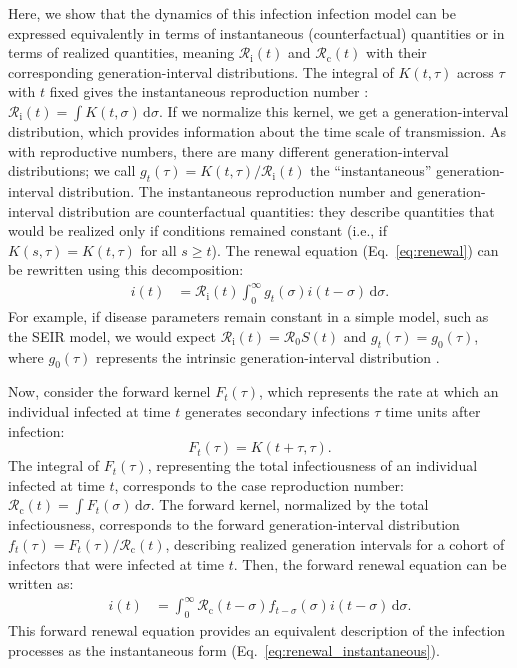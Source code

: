 \documentclass[12pt]{article}
\newcommand{\eref}[1]{Eq.~\ref{eq:#1}}
\newcommand{\Rx}[1]{\ensuremath{{\mathcal R}_{#1}}\xspace}
\newcommand{\Ro}{\Rx{0}}
\newcommand{\Rc}{\Rx{\mathrm{c}}}
\newcommand{\Ri}{\Rx{\mathrm{i}}}
\newcommand{\dd}[1]{\ensuremath{\, \mathrm{d}#1}}
\newcommand{\dsigma}{\dd{\sigma}}
\begin{document}
Here, we show that the dynamics of this infection infection model can be expressed equivalently in terms of instantaneous (counterfactual) quantities or in terms of realized quantities, meaning $\Ri(t)$ and $\Rc(t)$ with their corresponding generation-interval distributions.
The integral of $K(t, \tau)$ across $\tau$ with $t$ fixed gives the instantaneous reproduction number \citep{fraser2007estimating}: $\Ri(t) = \int K(t, \sigma) \dsigma$.
If we normalize this kernel, we get a generation-interval distribution, which provides information about the time scale of transmission.
As with reproductive numbers, there are many different generation-interval distributions; we call $g_t(\tau) = K(t, \tau)/\Ri(t)$ the ``instantaneous'' generation-interval distribution.
The instantaneous reproduction number and generation-interval distribution are counterfactual quantities: they describe quantities that would be realized only if conditions remained constant (i.e., if $K(s, \tau) = K(t, \tau)$ for all $s \geq t$).
The renewal equation (\eref{renewal}) can be rewritten using this decomposition:
\begin{align}
i(t) &= \Ri(t) \int_0^\infty g_t(\sigma) i(t-\sigma) \dsigma.
\label{eq:renewal_instantaneous}
\end{align}
For example, if disease parameters remain constant in a simple model, such as the SEIR model, we would expect $\Ri(t) = \Ro S(t)$ and $g_t(\tau) = g_0(\tau)$, where $g_0(\tau)$ represents the intrinsic generation-interval distribution \citep{champredon2015intrinsic}.

Now, consider the forward kernel $F_t(\tau)$, which represents the rate at which an individual infected at time $t$ generates secondary infections $\tau$ time units after infection: 
\begin{equation}
F_t(\tau) = K(t+\tau, \tau).
\label{eq:fkernel}
\end{equation}
The integral of $F_t(\tau)$, representing the total infectiousness of an individual infected at time $t$, corresponds to the case reproduction number: $\Rc(t) = \int F_t(\sigma) \dsigma$. 
The forward kernel, normalized by the total infectiousness, corresponds to the forward generation-interval distribution $f_t(\tau) = F_t(\tau)/\Rc(t)$, describing realized generation intervals for a cohort of infectors that were infected at time $t$.
Then, the forward renewal equation can be written as:
\begin{align}
i(t) &= \int_0^\infty \Rc(t-\sigma) f_{t-\sigma}(\sigma) i(t-\sigma) \dsigma.
\label{eq:renewal_forward}
\end{align}
This forward renewal equation provides an equivalent description of the infection processes as the instantaneous form (\eref{renewal_instantaneous}).
\end{document}
